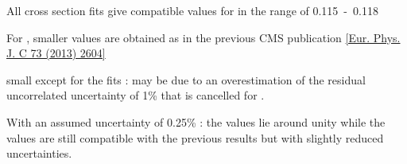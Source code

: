\begin{frame}
\begin{center}
\begin{itemize}
\item {\scriptsize All cross section fits give compatible values for \alpsmz in the range of 0.115~-~0.118
\vspace{1mm}
\item For \rations, smaller values are obtained as in the previous CMS \ratio publication \href{https://arxiv.org/abs/1304.7498}{[Eur. Phys. J. C 73 (2013) 2604]}
\vspace{1mm}
\item  small \chisqndof except for the \ratio fits : may be due to an overestimation of the residual uncorrelated uncertainty of 1\% that is cancelled for \ratio . 
\vspace{1mm}
\item With an assumed uncertainty of 0.25\% : the \chisqndof values lie around unity while the \alpsmz values are still compatible with the previous results but with slightly reduced uncertainties. \\}
\end{itemize}
\end{center}
\end{frame}

